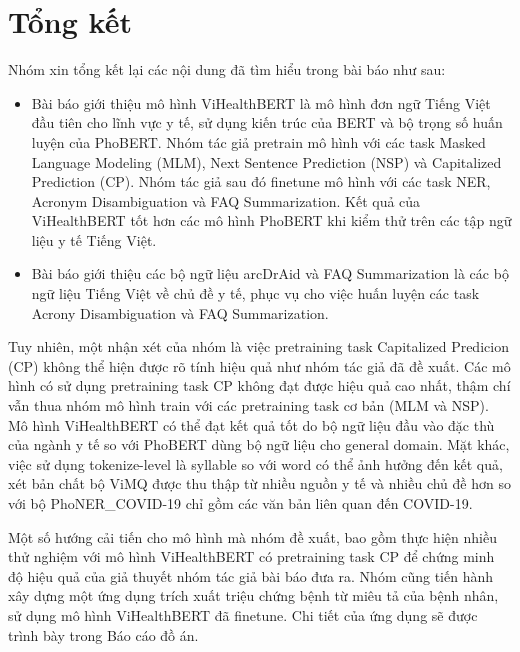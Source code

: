 \section{Tổng kết}
Nhóm xin tổng kết lại các nội dung đã tìm hiểu trong bài báo như sau:
\begin{itemize}
\item Bài báo giới thiệu mô hình ViHealthBERT là mô hình đơn ngữ Tiếng Việt đầu tiên cho lĩnh vực y tế, sử dụng kiến trúc của BERT và bộ trọng số huấn luyện của PhoBERT. Nhóm tác giả pretrain mô hình với các task Masked Language Modeling (MLM), Next Sentence Prediction (NSP) và Capitalized Prediction (CP). Nhóm tác giả sau đó finetune mô hình với các task NER, Acronym Disambiguation và FAQ Summarization. Kết quả của ViHealthBERT tốt hơn các mô hình PhoBERT khi kiểm thử trên các tập ngữ liệu y tế Tiếng Việt.
\item Bài báo giới thiệu các bộ ngữ liệu arcDrAid và FAQ Summarization là các bộ ngữ liệu Tiếng Việt về chủ đề y tế, phục vụ cho việc huấn luyện các task Acrony Disambiguation và FAQ Summarization.
\end{itemize}

Tuy nhiên, một nhận xét của nhóm là việc pretraining task Capitalized Predicion (CP) không thể hiện được rõ tính hiệu quả như nhóm tác giả đã đề xuất. Các mô hình có sử dụng pretraining task CP không đạt được hiệu quả cao nhất, thậm chí vẫn thua nhóm mô hình train với các pretraining task cơ bản (MLM và NSP). Mô hình ViHealthBERT có thể đạt kết quả tốt do bộ ngữ liệu đầu vào đặc thù của ngành y tế so với PhoBERT dùng bộ ngữ liệu cho general domain. Mặt khác, việc sử dụng tokenize-level là syllable so với word có thể ảnh hưởng đến kết quả, xét bản chất bộ ViMQ được thu thập từ nhiều nguồn y tế và nhiều chủ đề hơn so với bộ PhoNER\_COVID-19 chỉ gồm các văn bản liên quan đến COVID-19.

Một số hướng cải tiến cho mô hình mà nhóm đề xuất, bao gồm thực hiện nhiều thử nghiệm với mô hình ViHealthBERT có pretraining task CP để chứng minh độ hiệu quả của giả thuyết nhóm tác giả bài báo đưa ra. Nhóm cũng tiến hành xây dựng một ứng dụng trích xuất triệu chứng bệnh từ miêu tả của bệnh nhân, sử dụng mô hình ViHealthBERT đã finetune. Chi tiết của ứng dụng sẽ được trình bày trong Báo cáo đồ án.